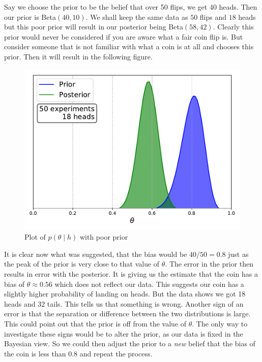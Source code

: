 \documentclass[12pt,twoside]{report}   %
\begin{document}
Say we choose the prior to be the belief that over 50 flips, we get 40 heads. Then our prior is Beta$(40,10)$. We shall keep the same data as $50$ flips and $18$ heads but this poor prior will result in our posterior being Beta$(58,42)$. Clearly this prior would never be considered if you are aware what a fair coin flip is. But consider someone that is not familiar with what a coin is at all and chooses this prior. Then it will result in the following figure.
\begin{figure}[H]
\centering
\includegraphics[width = 5in]{BadPrior1.pdf}
\caption{Plot of $p(\theta\mid h)$ with poor prior}
\label{figCoinFlipBad1}
\end{figure}

It is clear now what was suggested, that the bias would be $40/50 = 0.8$ just as the peak of the prior is very close to that value of $\theta$. The error in the prior then results in error with the posterior. It is giving us the estimate that the coin has a bias of $\theta \approx 0.56$ which does not reflect our data. This suggests our coin has a slightly higher probability of landing on heads. But the data shows we got 18 heads and 32 tails. This tells us that something is wrong. Another sign of an error is that the separation or difference between the two distributions is large. This could point out that the prior is off from the value of $\theta$. The only way to investigate these signs would be to alter the prior, as our data is fixed in the Bayesian view. So we could then adjust the prior to a \textit{new} belief that the bias of the coin is less than $0.8$ and repeat the process.
\end{document}
